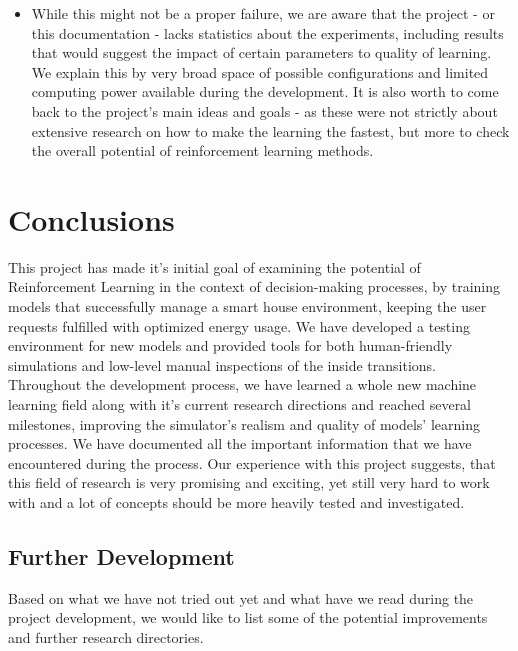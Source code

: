 \documentclass{article}
\begin{document}
\begin{itemize}
\item While this might not be a proper failure, we are aware that the project - or this documentation - lacks statistics about the experiments, including results that would suggest the impact of certain parameters to quality of learning. We explain this by very broad space of possible configurations and limited computing power available during the development. It is also worth to come back to the project's main ideas and goals - as these were not strictly about extensive research on how to make the learning the fastest, but more to check the overall potential of reinforcement learning methods. 
\end{itemize}

\section{Conclusions}

This project has made it's initial goal of examining the potential of Reinforcement Learning in the context of decision-making processes, by training models that successfully manage a smart house environment, keeping the user requests fulfilled with optimized energy usage. We have developed a testing environment for new models and provided tools for both human-friendly simulations and low-level manual inspections of the inside transitions. Throughout the development process, we have learned a whole new machine learning field along with it's current research directions and reached several milestones, improving the simulator's realism and quality of models' learning processes. We have documented all the important information that we have encountered during the process. Our experience with this project suggests, that this field of research is very promising and exciting, yet still very hard to work with and a lot of concepts should be more heavily tested and investigated.
\subsection{Further Development}
Based on what we have not tried out yet and what have we read during the project development, we would like to list some of the potential improvements and further research directories.
\end{document}
